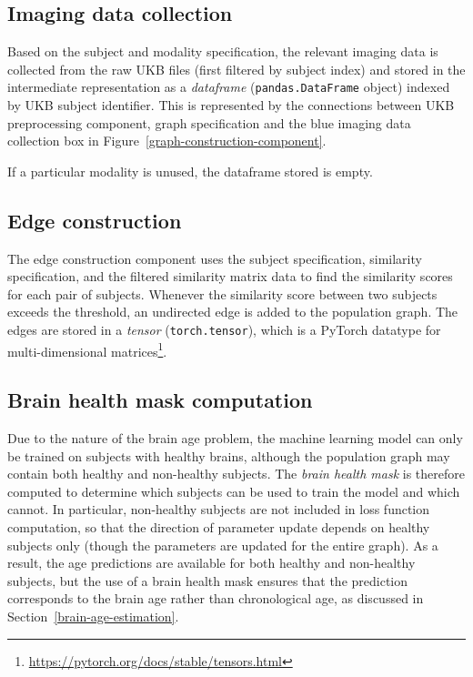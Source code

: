 \subsection{Imaging data collection}

Based on the subject and modality specification, the relevant imaging data is collected from the raw UKB files (first filtered by subject index) and stored in the intermediate representation as a \textit{dataframe} (\texttt{pandas.DataFrame} object) indexed by UKB subject identifier. This is represented by the connections between UKB preprocessing component, graph specification and the blue imaging data collection box in Figure~\ref{graph-construction-component}. 

If a particular modality is unused, the dataframe stored is empty.

\subsection{Edge construction}

The edge construction component uses the subject specification, similarity specification, and the filtered similarity matrix data to find the similarity scores for each pair of subjects. Whenever the similarity score between two subjects exceeds the threshold, an undirected edge is added to the population graph. The edges are stored in a \textit{tensor} (\texttt{torch.tensor}), which is a PyTorch datatype for multi-dimensional matrices\footnote{\url{https://pytorch.org/docs/stable/tensors.html}}.

\subsection{Brain health mask computation}

Due to the nature of the brain age problem, the machine learning model can only be trained on subjects with healthy brains, although the population graph may contain both healthy and non-healthy subjects. The \textit{brain health mask} is therefore computed to determine which subjects can be used to train the model and which cannot. In particular, non-healthy subjects are not included in loss function computation, so that the direction of parameter update depends on healthy subjects only (though the parameters are updated for the entire graph). As a result, the age predictions are available for both healthy and non-healthy subjects, but the use of a brain health mask ensures that the prediction corresponds to the brain age rather than chronological age, as discussed in Section~\ref{brain-age-estimation}.

